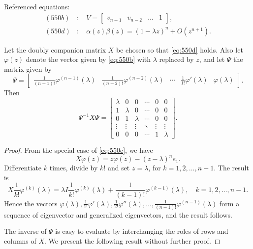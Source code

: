 Referenced equations:
\begin{align}
    (550b)&: \quad V = \begin{bmatrix} v_{n-1} & v_{n-2} & \dots & 1 \end{bmatrix},\\
    (550d)&: \quad \alpha(z)\beta(z) = (1 - \lambda z)^n + O(z^{n+1}).
\end{align}

\begin{theorem}

  \label{thm:550B}
Let the doubly companion matrix \(X\) be chosen so that
\eqref{eq:550d} holds. Also let \(\varphi(z)\) denote the vector given by \eqref{eq:550b} with \(\lambda\) replaced
by \(z\), and let \(\Psi\) the matrix given by
\[
\Psi = \begin{bmatrix}
\frac{1}{(n-1)!} \varphi^{(n-1)}(\lambda) &
\frac{1}{(n-2)!} \varphi^{(n-2)}(\lambda) &
\cdots &
\frac{1}{1!} \varphi'(\lambda) &
\varphi(\lambda)
\end{bmatrix}.
\]
Then
\[
\Psi^{-1} X \Psi = \begin{bmatrix}
\lambda & 0 & 0 & \cdots & 0 & 0 \\
1 & \lambda & 0 & \cdots & 0 & 0 \\
0 & 1 & \lambda & \cdots & 0 & 0 \\
\vdots & \vdots & \vdots & \ddots & \vdots & \vdots \\
0 & 0 & 0 & \cdots & 1 & \lambda
\end{bmatrix}.
\]
\end{theorem}

\begin{proof}
From the special case of \eqref{eq:550c}, we have
\[
X \varphi(z) = z \varphi(z) - (z - \lambda)^n e_1. \tag{550e}
\]
Differentiate \(k\) times, divide by \(k!\) and set \(z = \lambda\), for \(k = 1, 2, \dots, n - 1\). The
result is
\[
X \frac{1}{k!} \varphi^{(k)}(\lambda) = \lambda I \frac{1}{k!} \varphi^{(k)}(\lambda) + \frac{1}{(k-1)!} \varphi^{(k-1)}(\lambda), \quad k = 1, 2, \dots, n - 1.
\]
Hence the vectors \(\varphi(\lambda), \frac{1}{1!} \varphi'(\lambda), \frac{1}{2!} \varphi''(\lambda), \dots, \frac{1}{(n-1)!} \varphi^{(n-1)}(\lambda)\) form a sequence
of eigenvector and generalized eigenvectors, and the result follows.

The inverse of \(\Psi\) is easy to evaluate by interchanging the roles of rows and
columns of \(X\). We present the following result without further proof.
\end{proof}

